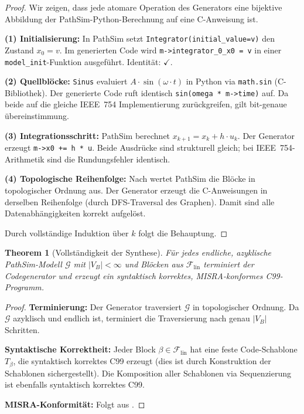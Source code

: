 ﻿\documentclass[12pt,a4paper]{article}
\newtheorem{theorem}{Theorem}[section]
\theoremstyle{definition}
\begin{document}
\begin{proof}
Wir zeigen, dass jede atomare Operation des Generators eine bijektive Abbildung
der PathSim-Python-Berechnung auf eine C-Anweisung ist.

\textbf{(1) Initialisierung:} In PathSim setzt \texttt{Integrator(initial\_value=v)}
den Zustand $x_0 = v$. Im generierten Code wird \texttt{m->integrator\_0\_x0 = v}
in einer \texttt{model\_init}-Funktion ausgeführt. Identität: $\checkmark$.

\textbf{(2) Quellblöcke:} \texttt{Sinus} evaluiert
$A\cdot\sin(\omega\cdot t)$ in Python via \texttt{math.sin} (C-Bibliothek).
Der generierte Code ruft identisch \texttt{sin(omega * m->time)} auf.
Da beide auf die gleiche IEEE~754 Implementierung zurückgreifen, gilt
bit-genaue übereinstimmung.

\textbf{(3) Integrationsschritt:} PathSim berechnet $x_{k+1} = x_k + h \cdot u_k$.
Der Generator erzeugt \texttt{m->x0 += h * u}. Beide Ausdrücke sind
strukturell gleich; bei IEEE~754-Arithmetik sind die Rundungsfehler identisch.

\textbf{(4) Topologische Reihenfolge:} Nach  wertet PathSim
die Blöcke in topologischer Ordnung aus. Der Generator erzeugt die
C-Anweisungen in derselben Reihenfolge (durch DFS-Traversal des Graphen).
Damit sind alle Datenabhängigkeiten korrekt aufgelöst.

Durch vollständige Induktion über $k$ folgt die Behauptung.
\end{proof}

\begin{theorem}[Vollständigkeit der Synthese]
\label{thm:complete}
Für jedes endliche, azyklische PathSim-Modell $\mathcal{G}$ mit
$|V_B| < \infty$ und Blöcken aus $\mathcal{F}_{\mathrm{lin}}$ terminiert
der Codegenerator und erzeugt ein syntaktisch korrektes, MISRA-konformes
C99-Programm.
\end{theorem}

\begin{proof}
\textbf{Terminierung:} Der Generator traversiert $\mathcal{G}$ in topologischer
Ordnung. Da $\mathcal{G}$ azyklisch und endlich ist, terminiert die Traversierung
nach genau $|V_B|$ Schritten.

\textbf{Syntaktische Korrektheit:} Jeder Block $\beta \in \mathcal{F}_{\mathrm{lin}}$
hat eine feste Code-Schablone $T_\beta$, die syntaktisch korrektes C99 erzeugt
(dies ist durch Konstruktion der Schablonen sichergestellt). Die Komposition
aller Schablonen via Sequenzierung ist ebenfalls syntaktisch korrektes C99.

\textbf{MISRA-Konformität:} Folgt aus .
\end{proof}
\end{document}
